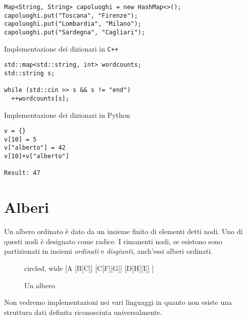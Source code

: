 \begin{listing}[H]
%
\label{lst:java-dictionary}
\begin{verbatim}
Map<String, String> capoluoghi = new HashMap<>();
capoluoghi.put("Toscana", "Firenze");
capoluoghi.put("Lombardia", "Milano");
capoluoghi.put("Sardegna", "Cagliari");
\end{verbatim}
\end{listing}
\vspace{-25pt}

\begin{listing}[H]
\caption{Implementazione dei dizionari in \texttt{C++}}%
\label{lst:cpp-dictionary}
\begin{verbatim}
std::map<std::string, int> wordcounts;
std::string s;

while (std::cin >> s && s != "end")
  ++wordcounts[s];
\end{verbatim}
\end{listing}
\vspace{-25pt}

\begin{listing}[H]
\caption{Implementazione dei dizionari in Python}%
\label{lst:python-dictionary}
\begin{verbatim}
v = {}
v[10] = 5
v["alberto"] = 42
v[10]+v["alberto"]

Result: 47
\end{verbatim}
\end{listing}
\vspace{-25pt}

\section{Alberi}

Un albero ordinato è dato da un insieme finito di elementi detti nodi.
Uno di questi nodi è designato come radice.
I rimanenti nodi, se esistono sono partizionati in insiemi \emph{ordinati} e \emph{disgiunti}, anch'essi alberi ordinati.

\begin{figure}[H]
	\centering
	\begin{forest} circled, wide
	[A
		[B[C]]
		[C[F][G]]
		[D[H][I]]
	]
	\end{forest}
	\caption[]{Un albero}
\end{figure}

Non vedremo implementazioni nei vari linguaggi in quanto non esiste una struttura dati definita riconosciuta universalmente.


